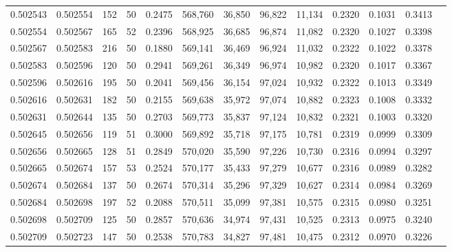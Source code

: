\begin{tabular}{rrrrrrrrrrrrr}
0.502543 & 0.502554 & 152 &  50 &                                     0.2475 & 568,760 &  36,850 &  96,822 &  11,134 & 0.2320 & 0.1031 & 0.3413 \\
0.502554 & 0.502567 & 165 &  52 &                                     0.2396 & 568,925 &  36,685 &  96,874 &  11,082 & 0.2320 & 0.1027 & 0.3398 \\
0.502567 & 0.502583 & 216 &  50 &                                     0.1880 & 569,141 &  36,469 &  96,924 &  11,032 & 0.2322 & 0.1022 & 0.3378 \\
0.502583 & 0.502596 & 120 &  50 &                                     0.2941 & 569,261 &  36,349 &  96,974 &  10,982 & 0.2320 & 0.1017 & 0.3367 \\
0.502596 & 0.502616 & 195 &  50 &                                     0.2041 & 569,456 &  36,154 &  97,024 &  10,932 & 0.2322 & 0.1013 & 0.3349 \\
0.502616 & 0.502631 & 182 &  50 &                                     0.2155 & 569,638 &  35,972 &  97,074 &  10,882 & 0.2323 & 0.1008 & 0.3332 \\
0.502631 & 0.502644 & 135 &  50 &                                     0.2703 & 569,773 &  35,837 &  97,124 &  10,832 & 0.2321 & 0.1003 & 0.3320 \\
0.502645 & 0.502656 & 119 &  51 &                                     0.3000 & 569,892 &  35,718 &  97,175 &  10,781 & 0.2319 & 0.0999 & 0.3309 \\
0.502656 & 0.502665 & 128 &  51 &                                     0.2849 & 570,020 &  35,590 &  97,226 &  10,730 & 0.2316 & 0.0994 & 0.3297 \\
0.502665 & 0.502674 & 157 &  53 &                                     0.2524 & 570,177 &  35,433 &  97,279 &  10,677 & 0.2316 & 0.0989 & 0.3282 \\
0.502674 & 0.502684 & 137 &  50 &                                     0.2674 & 570,314 &  35,296 &  97,329 &  10,627 & 0.2314 & 0.0984 & 0.3269 \\
0.502684 & 0.502698 & 197 &  52 &                                     0.2088 & 570,511 &  35,099 &  97,381 &  10,575 & 0.2315 & 0.0980 & 0.3251 \\
0.502698 & 0.502709 & 125 &  50 &                                     0.2857 & 570,636 &  34,974 &  97,431 &  10,525 & 0.2313 & 0.0975 & 0.3240 \\
0.502709 & 0.502723 & 147 &  50 &                                     0.2538 & 570,783 &  34,827 &  97,481 &  10,475 & 0.2312 & 0.0970 & 0.3226 \\

\end{tabular}
